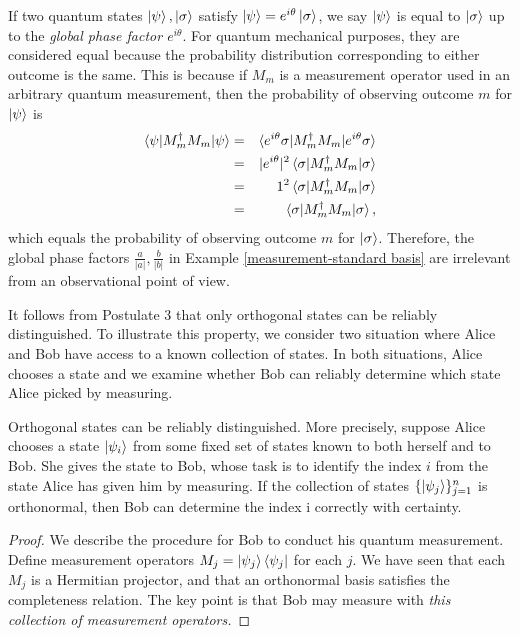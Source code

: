 {If two quantum states $\ket{\psi}, \ket{\sigma}$ satisfy $\ket{\psi}=e^{i\theta}\ket{\sigma}$, we say $\ket{\psi}$ is equal to $\ket{\sigma}$ up to the \textit{global phase factor $e^{i\theta}$}. For quantum mechanical purposes, they are considered equal because the probability distribution corresponding to either outcome is the same. This is because if $M_m$ is a measurement operator used in an arbitrary quantum measurement, then the probability of observing outcome $m$ for $\ket{\psi}$ is 
\begin{eqnarray}
\braket{\psi|M_m^\dagger M_m|\psi} &=& \braket{e^{i\theta}\sigma|M_m^\dagger M_m|e^{i\theta} \sigma} \\
&=& |e^{i\theta}|^2\braket{\sigma|M_m^\dagger M_m| \sigma} \\
&=& 1^2\braket{\sigma|M_m^\dagger M_m| \sigma} \\
&=& \braket{\sigma|M_m^\dagger M_m| \sigma} ,
\end{eqnarray}
which equals the probability of observing outcome $m$ for $\ket{\sigma}$.  Therefore, the global phase factors $\frac{a}{|a|}, \frac{b}{|b|}$ in Example \ref{measurement-standard basis} are irrelevant from an observational point of view.

\bigskip
It follows from Postulate 3 that only orthogonal states can be reliably distinguished. To illustrate this property, we consider two situation where Alice and Bob have access to a known collection of states.  In both situations, Alice chooses a state and we examine whether Bob can reliably determine which state Alice picked by measuring.

\begin{example} \label{theorem-distinguishing orthogonal states}
Orthogonal states can be reliably distinguished. More precisely, suppose Alice chooses a state $\ket{\psi_i}$ from some fixed set of states known to both herself and to Bob. She gives the state to Bob, whose task is to identify the index $i$ from the state Alice has given him by measuring. If the collection of states $\{\ket{\psi_j}\}_{j=1}^n$ is orthonormal, then Bob can determine the index i correctly with certainty.
\end{example}
\begin{proof}
We describe the procedure for Bob to conduct his quantum measurement.  Define measurement operators $M_j=\ket{\psi_j}\bra{\psi_j}$ for each $j$.  We have seen that each $M_j$ is a Hermitian projector, and that an orthonormal basis satisfies the completeness relation.  The key point is that Bob may measure with {\emph{this collection of measurement operators.}}


\end{proof}}

